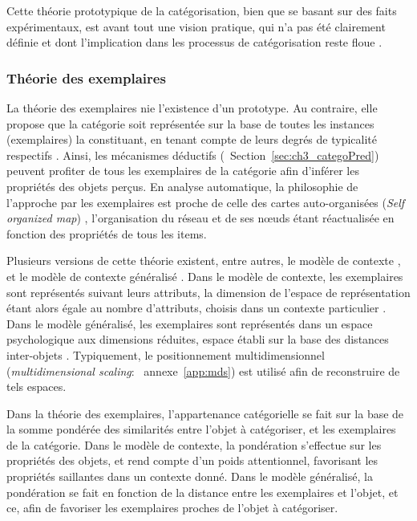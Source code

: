 Cette théorie prototypique de la catégorisation, bien que se basant sur des faits expérimentaux, est avant tout une vision pratique, qui n'a pas été clairement définie et dont l'implication dans les processus de catégorisation reste floue \citep[p. 36-40]{rosch1978cognition} \citep[p. 49-54]{dubois1991semantique}.

\subsubsection{Théorie des exemplaires}

La théorie des exemplaires nie l'existence d'un prototype. Au contraire, elle propose que la catégorie soit représentée sur la base de toutes les instances (exemplaires) la constituant, en tenant compte de leurs degrés de typicalité respectifs \citep{medin1978context,nosofsky1986attention,nosofsky1992similarity}. Ainsi, les mécanismes déductifs (\cf~Section~\ref{sec:ch3_categoPred}) peuvent profiter de tous les exemplaires de la catégorie afin d'inférer les propriétés des objets perçus. En analyse automatique, la philosophie de l'approche par les exemplaires est proche de celle des cartes auto-organisées (\emph{Self organized map}) \citep{kohonen1995som}, l’organisation du réseau et de ses nœuds étant réactualisée en fonction des propriétés de tous les items.

Plusieurs versions de cette théorie existent, entre autres, le modèle de contexte \citep{medin1978context}, et le modèle de contexte généralisé \citep{nosofsky1986attention}. Dans le modèle de contexte, les exemplaires sont représentés suivant leurs attributs, la dimension de l'espace de représentation étant alors égale au nombre d'attributs, choisis dans un contexte particulier \citep{hitzman1986schema}. Dans le modèle généralisé, les exemplaires sont représentés dans un espace psychologique aux dimensions réduites, espace établi sur la base des distances inter-objets \citep{nosofsky1992similarity}. Typiquement, le positionnement multidimensionnel (\emph{multidimensional scaling}: \cf~annexe~\ref{app:mds}) est utilisé afin de reconstruire de tels espaces.

Dans la théorie des exemplaires, l'appartenance catégorielle se fait sur la base de la somme pondérée des similarités entre l'objet à catégoriser, et les exemplaires de la catégorie. Dans le modèle de contexte, la pondération s'effectue sur les propriétés des objets, et rend compte d'un poids attentionnel, favorisant les propriétés saillantes dans un contexte donné. Dans le modèle généralisé, la pondération se fait en fonction de la distance entre les exemplaires et l'objet, et ce, afin de favoriser les exemplaires proches de l'objet à catégoriser.

